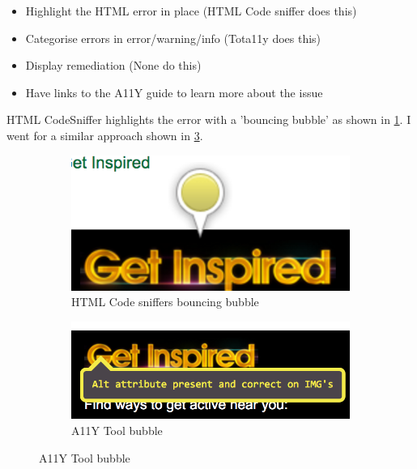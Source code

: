 \begin{itemize}
\item Highlight the HTML error in place (HTML Code sniffer does this)
\item Categorise errors in error/warning/info (Tota11y does this)
\item Display remediation (None do this)
\item Have links to the A11Y guide to learn more about the issue
\end{itemize}

HTML CodeSniffer highlights the error with a 'bouncing bubble' as shown in
\ref{fig:codesniffer}. I went for a similar approach shown in
\ref{fig:tool_bubble}.

\begin{figure}[H]
    \centering
    \begin{subfigure}[b]{0.25\textwidth}
        \includegraphics[width=\textwidth]{figures/codesniffer}
        \captionsetup{justification=centering}
        \caption{HTML Code sniffers bouncing bubble}
        \label{fig:codesniffer}
    \end{subfigure}
    \qquad
    \begin{subfigure}[b]{0.4\textwidth}
        \includegraphics[width=\textwidth]{figures/tool_bubble}
        \captionsetup{justification=centering}
        \caption{A11Y Tool bubble}
        \label{fig:tool_bubble}
    \end{subfigure}
\end{figure}

